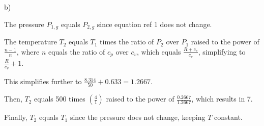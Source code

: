b)

The pressure \( P_{1,g} \) equals \( P_{2,g} \) since equation ref 1 does not change.

The temperature \( T_2 \) equals \( T_1 \) times the ratio of \( P_2 \) over \( P_1 \) raised to the power of \( \frac{n-1}{n} \), where \( n \) equals the ratio of \( c_p \) over \( c_v \), which equals \( \frac{R + c_v}{c_v} \), simplifying to \( \frac{R}{c_v} + 1 \).

This simplifies further to \( \frac{8.314}{50} + 0.633 = 1.2667 \).

Then, \( T_2 \) equals 500 times \( \left( \frac{4}{1} \right) \) raised to the power of \( \frac{0.2667}{1.2667} \), which results in 7.

Finally, \( T_2 \) equals \( T_1 \) since the pressure does not change, keeping \( T \) constant.